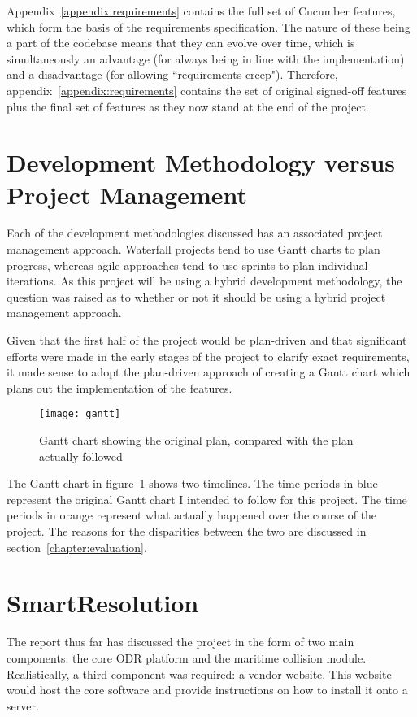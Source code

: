 Appendix~\ref{appendix:requirements} contains the full set of Cucumber features, which form the basis of the requirements specification. The nature of these being a part of the codebase means that they can evolve over time, which is simultaneously an advantage (for always being in line with the implementation) and a disadvantage (for allowing ``requirements creep"). Therefore, appendix~\ref{appendix:requirements} contains the set of original signed-off features plus the final set of features as they now stand at the end of the project.

\section{Development Methodology versus Project Management}

Each of the development methodologies discussed has an associated project management approach. Waterfall projects tend to use Gantt charts to plan progress, whereas agile approaches tend to use sprints to plan individual iterations. As this project will be using a hybrid development methodology, the question was raised as to whether or not it should be using a hybrid project management approach.

Given that the first half of the project would be plan-driven and that significant efforts were made in the early stages of the project to clarify exact requirements, it made sense to adopt the plan-driven approach of creating a Gantt chart which plans out the implementation of the features.

\begin{figure}[h!]
  \centering
    \ifimages
    \texttt{[image: gantt]}
    \fi
  \caption{Gantt chart showing the original plan, compared with the plan actually followed}
  \label{uml:gantt}
\end{figure}

The Gantt chart in figure~\ref{uml:gantt} shows two timelines. The time periods in blue represent the original Gantt chart I intended to follow for this project. The time periods in orange represent what actually happened over the course of the project. The reasons for the disparities between the two are discussed in section~\ref{chapter:evaluation}.

\section{SmartResolution}

The report thus far has discussed the project in the form of two main components: the core ODR platform and the maritime collision module. Realistically, a third component was required: a vendor website. This website would host the core software and provide instructions on how to install it onto a server.

